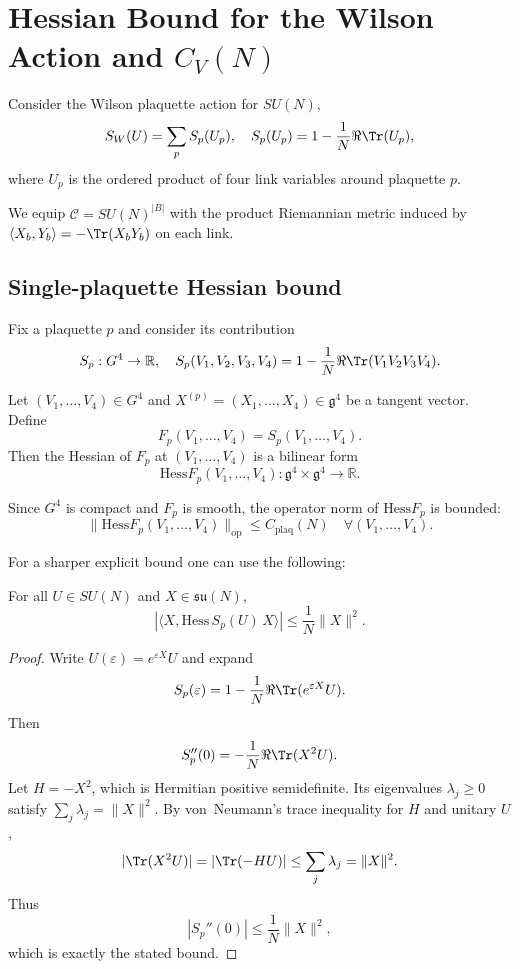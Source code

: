 
\section{Hessian Bound for the Wilson Action and $C_V(N)$}

Consider the Wilson plaquette action for $SU(N)$,
\[
S_W(U) = \sum_p S_p(U_p),
\quad
S_p(U_p) = 1 - \frac{1}{N}\Re \Tr(U_p),
\]
where $U_p$ is the ordered product of four link variables around plaquette $p$.

We equip $\mathcal{C} = SU(N)^{|B|}$ with the product Riemannian metric induced by
$\langle X_b, Y_b \rangle = -\Tr(X_b Y_b)$ on each link.

\subsection{Single-plaquette Hessian bound}

Fix a plaquette $p$ and consider its contribution
\[
S_p : G^4 \rightarrow \mathbb{R}, \quad
S_p(V_1,V_2,V_3,V_4) = 1 - \frac{1}{N}\Re \Tr(V_1 V_2 V_3 V_4).
\]

Let $(V_1,\dots,V_4) \in G^4$ and $X^{(p)} = (X_1,\dots,X_4) \in \mathfrak{g}^4$ be a tangent vector.
Define
\[
F_p(V_1,\dots,V_4) = S_p(V_1,\dots,V_4).
\]
Then the Hessian of $F_p$ at $(V_1,\dots,V_4)$ is a bilinear form
\[
\mathrm{Hess}F_p(V_1,\dots,V_4) : \mathfrak{g}^4\times\mathfrak{g}^4 \to \mathbb{R}.
\]

Since $G^4$ is compact and $F_p$ is smooth, the operator norm of
$\mathrm{Hess}F_p$ is bounded:
\[
\|\mathrm{Hess}F_p(V_1,\dots,V_4)\|_{\mathrm{op}} \le C_{\mathrm{plaq}}(N)
\quad \forall (V_1,\dots,V_4).
\]

For a sharper explicit bound one can use the following:

\begin{lemma}
For all $U \in SU(N)$ and $X \in \mathfrak{su}(N)$,
\[
\left|\big\langle X, \mathrm{Hess}\,S_p(U)\,X \big\rangle\right|
\le \frac{1}{N} \|X\|^2.
\]
\end{lemma}

\begin{proof}
Write $U(\varepsilon) = e^{\varepsilon X}U$ and expand
\[
S_p(\varepsilon) = 1 - \frac{1}{N}\Re \Tr(e^{\varepsilon X} U).
\]
Then
\[
S_p''(0) = -\frac{1}{N}\Re \Tr(X^2 U).
\]
Let $H = -X^2$, which is Hermitian positive semidefinite. Its eigenvalues
$\lambda_j \ge 0$ satisfy $\sum_j \lambda_j = \|X\|^2$.
By von~Neumann's trace inequality for $H$ and unitary $U$,
\[
|\Tr(X^2 U)| = |\Tr(-H U)|
\le \sum_j \lambda_j = \|X\|^2.
\]
Thus
\[
|S_p''(0)| \le \frac{1}{N}\|X\|^2,
\]
which is exactly the stated bound.
\end{proof}

